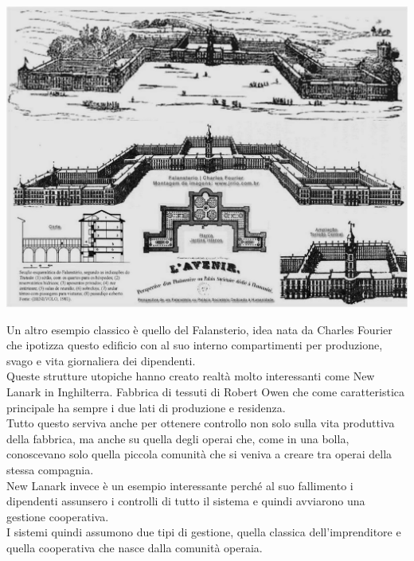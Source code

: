 \documentclass[a4paper,12pt, oneside]{book}
\begin{document}
    \begin{center}
    	\includegraphics[width=0.6\linewidth]{"immagini/Falansterio"}
    \end{center}
    Un altro esempio classico è quello del Falansterio, idea nata da Charles Fourier che ipotizza questo edificio con al suo interno compartimenti per produzione, svago e vita giornaliera dei dipendenti.\\
    Queste strutture utopiche hanno creato realtà molto interessanti come New Lanark in Inghilterra. Fabbrica di tessuti di Robert Owen che come caratteristica principale ha sempre i due lati di produzione e residenza.\\
    Tutto questo serviva anche per ottenere controllo non solo sulla vita produttiva della fabbrica, ma anche su quella degli operai che, come in una bolla, conoscevano solo quella piccola comunità che si veniva a creare tra operai della stessa compagnia.\\
    New Lanark invece è un esempio interessante perché al suo fallimento i dipendenti assunsero i controlli di tutto il sistema e quindi avviarono una gestione cooperativa.\\
    I sistemi quindi assumono due tipi di gestione, quella classica dell'imprenditore e quella cooperativa che nasce dalla comunità operaia.\\
\end{document}

